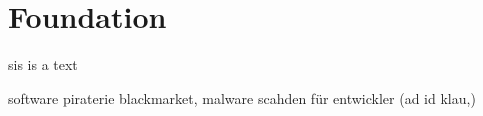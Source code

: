 \chapter{Foundation}\label{chapter:foundation}

sis is a text





software piraterie
blackmarket, malware
scahden für entwickler (ad id klau,)
